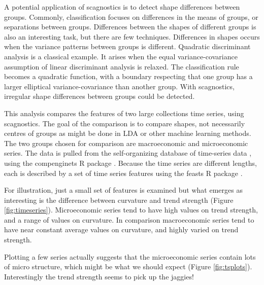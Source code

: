 A potential application of scagnostics is to detect shape differences
between groups. Commonly, classification focuses on differences in the
means of groups, or separations between groups. Differences between the
shapes of different groups is also an interesting task, but there are
few techniques. Differences in shapes occurs when the variance patterns
between groups is different. Quadratic discriminant analysis is a
classical example. It arises when the equal variance-covariance
assumption of linear discriminant analysis is relaxed. The
classification rule becomes a quadratic function, with a boundary
respecting that one group has a larger elliptical variance-covariance
than another group. With scagnostics, irregular shape differences
between groups could be detected.

This analysis compares the features of two large collections time
series, using scagnostics. The goal of the comparison is to compare
shapes, not necessarily centres of groups as might be done in LDA or
other machine learning methods. The two groups chosen for comparison are
macroeconomic and microeconomic series. The data is pulled from the
self-organizing database of time-series data \citep{sots}, using the
compenginets R package \citep{compenginets}. Because the time series are
different lengths, each is described by a set of time series features
\citep[chapter 4 of][]{fpp} using the feasts R package \citep{feasts}.

For illustration, just a small set of features is examined but what
emerges as interesting is the difference between curvature and trend
strength (Figure \ref{fig:timeseries}). Microeconomic series tend to
have high values on trend strength, and a range of values on curvature.
In comparison macroeconomic series tend to have near constant average
values on curvature, and highly varied on trend strength.

Plotting a few series actually suggests that the microeconomic series
contain lots of micro structure, which might be what we should expect
(Figure \ref{fig:tsplots}). Interestingly the trend strength seems to
pick up the jaggies!

